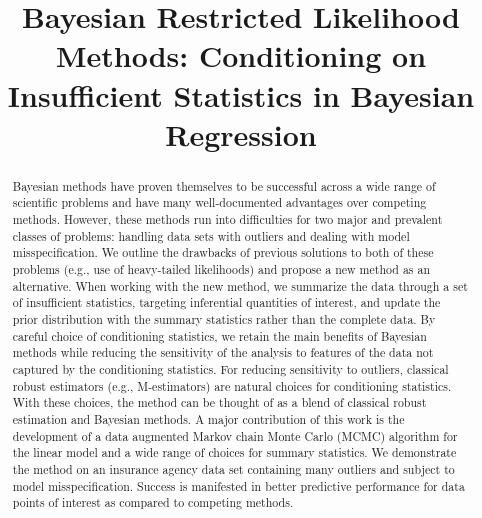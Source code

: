 \documentclass[ba]{imsart}
\begin{document}
\begin{frontmatter}
\title{Bayesian Restricted Likelihood Methods: Conditioning on Insufficient Statistics in Bayesian Regression}



\begin{abstract}
Bayesian methods have proven themselves to be successful across a wide
range of scientific problems and have many well-documented advantages
over competing methods. However, these methods run into difficulties
for two major and prevalent classes of problems: handling data sets
with outliers and dealing with model misspecification. We outline the
drawbacks of previous solutions to both of these problems (e.g., use of
heavy-tailed likelihoods) and propose a new method as an
alternative.  When working with the new method, we summarize
the data through a set of insufficient statistics,
targeting inferential quantities of interest, and update the prior
distribution with the summary statistics rather than the complete
data.  By careful choice of conditioning statistics, we
retain the main benefits of Bayesian methods while reducing the
sensitivity of the analysis to features of the data not captured by
the conditioning statistics. For reducing sensitivity to outliers,
classical robust estimators (e.g., M-estimators) are natural choices
for conditioning statistics. With these choices, the method can be thought of as a
blend of classical robust estimation and Bayesian methods. A major contribution of this work is the development of a data 
augmented Markov chain Monte Carlo (MCMC) algorithm
for the linear model and a wide range of choices for
summary statistics. We demonstrate the method on an
insurance agency data set containing many outliers and subject to model
misspecification. Success is manifested in better predictive
performance for data points of interest as compared to competing
methods.
\end{abstract}


\end{frontmatter}
\end{document}
